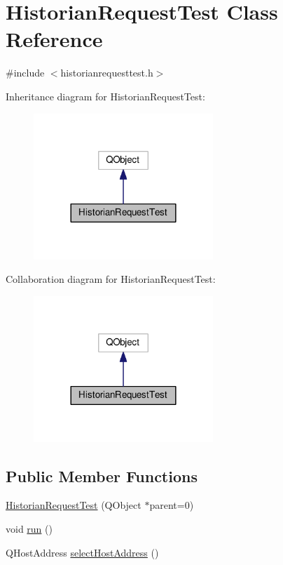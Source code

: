 \hypertarget{class_historian_request_test}{}\section{Historian\+Request\+Test Class Reference}
\label{class_historian_request_test}


{\ttfamily \#include $<$historianrequesttest.\+h$>$}



Inheritance diagram for Historian\+Request\+Test\+:
\nopagebreak
\begin{figure}[H]
\begin{center}
\leavevmode
\includegraphics[width=192pt]{class_historian_request_test__inherit__graph}
\end{center}
\end{figure}


Collaboration diagram for Historian\+Request\+Test\+:
\nopagebreak
\begin{figure}[H]
\begin{center}
\leavevmode
\includegraphics[width=192pt]{class_historian_request_test__coll__graph}
\end{center}
\end{figure}
\subsection*{Public Member Functions}
\begin{DoxyCompactItemize}
\item 
\hyperlink{class_historian_request_test_aed96cd0007dcbb0e88fc6c045228d774}{Historian\+Request\+Test} (Q\+Object $\ast$parent=0)
\item 
void \hyperlink{class_historian_request_test_a334a2bc181d5605d394bb9e5afe5631a}{run} ()
\item 
Q\+Host\+Address \hyperlink{class_historian_request_test_a33e035ef4a4374cfe7c34199f6163212}{select\+Host\+Address} ()
\end{DoxyCompactItemize}


